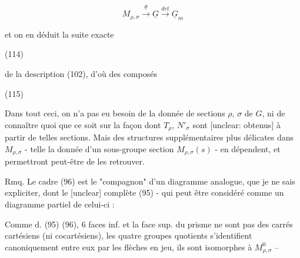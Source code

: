 \begin{enumerate}
$$ M_{\rho, \sigma} \overset{\underline{\theta}}{\longrightarrow} \underline{G} \overset{det}{\longrightarrow} \underline{G}_m $$

et on en déduit la suite exacte

(114)

\newpage


de la description (102), d'où des composés

(115)

Dans tout ceci, on n'a pas eu besoin de la
donnée de sections $\rho$, $\sigma$ de $G$, ni de
connaître quoi que ce soit sur la façon
dont $T_\rho$, $N'_\sigma$ sont [unclear: obtenus] à partir de telles
sections. Mais des structures supplémentaires
plus délicates dans $M_{\rho,\sigma}$ - telle la
donnée d'un sous-groupe section $M_{\rho,\sigma}(s)$ -
en dépendent, et permettront peut-être de
les retrouver.

Rmq. Le cadre (96) est le "compagnon"
d'un diagramme analogue, que je
ne sais expliciter, dont le [unclear]
complète (95) - qui peut être considéré
comme un diagramme partiel de
celui-ci :

\newpage


Comme d. (95) (96), 6 faces inf. 
et la face sup. du prisme ne sont pas des
carrés cartésiens (ni cocartésiens), les quatre groupes
quotients s'identifient canoniquement entre eux par les
flèches en jeu, ils sont isomorphes à 
$M_{\rho,\sigma}^0$ --


\end{enumerate}
